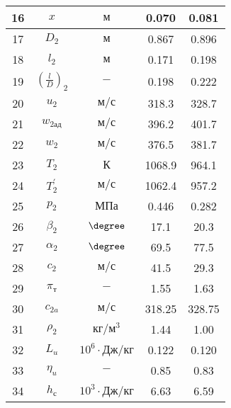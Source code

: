 \begin{center}
\begin{longtable}{|c|c|c|c|c|}
        16 & $x$ & $м$ & 0.070 & 0.081 \\\hline
        
        17 & $D_2$ & $м$ & 0.867 & 0.896 \\\hline
        
        18 & $l_2$ & $м$ & 0.171 & 0.198 \\\hline
        
        19 & $\left( \frac{l}{D} \right)_2$ & $-$ & 0.198 & 0.222 \\\hline
        
        20 & $u_2$ & $м/с$ & 318.3 & 328.7 \\\hline
        
        21 & $w_{2ад}$ & $м/с$ & 396.2 & 401.7 \\\hline
        
        22 & $w_2$ & $м/с$ & 376.5 & 381.7 \\\hline
        
        23 & $T_2$ & $К$ & 1068.9 & 964.1 \\\hline
        
        24 & $T_2^\prime$ & $м/с$ & 1062.4 & 957.2 \\\hline
        
        25 & $p_2$ & $МПа$ & 0.446 & 0.282 \\\hline
        
        26 & $\beta_2$ & $\degree$ & 17.1 & 20.3 \\\hline
        
        27 & $\alpha_2$ & $\degree$ & 69.5 & 77.5 \\\hline
        
        28 & $c_2$ & $м/с$ & 41.5 & 29.3 \\\hline
        
        29 & $\pi_т$ & $-$ & 1.55 & 1.63 \\\hline
        
        30 & $c_{2a}$ & $м/с$ & 318.25 & 328.75 \\\hline
        
        31 & $\rho_2$ & $кг/м^3$ & 1.44 & 1.00 \\\hline
        
        32 & $L_u$ & $10^6 \cdot Дж/кг$ & 0.122 & 0.120 \\\hline
        
        33 & $\eta_u$ & $-$ & 0.85 & 0.83 \\\hline
        
        34 & $h_с$ & $10^3 \cdot Дж/кг$ & 6.63 & 6.59 \\\hline
        

\end{longtable}
\end{center}
